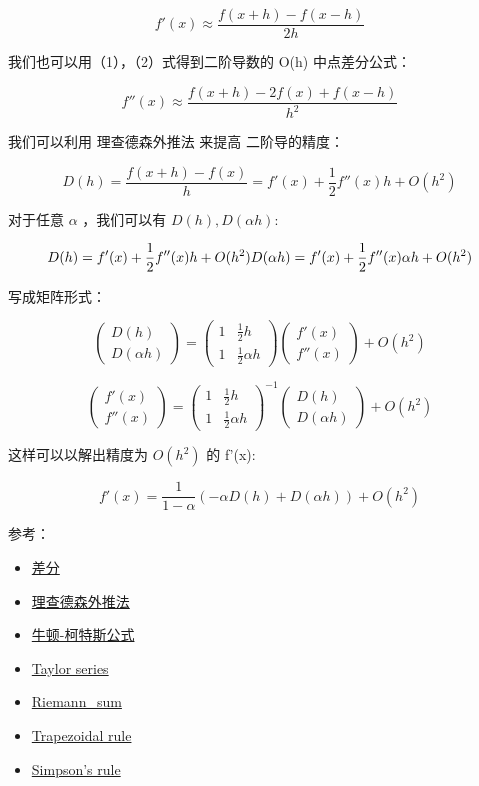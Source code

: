 \documentclass[
]{book}
\providecommand{\tightlist}{%
  \setlength{\itemsep}{0pt}\setlength{\parskip}{0pt}}
\begin{document}
\[
f'(x)  \approx \frac{f(x+h) - f(x-h)}{2h}
\]

我们也可以用（1），（2）式得到二阶导数的 O(h) 中点差分公式：

\[
f''(x) \approx \frac{f(x+h) - 2f(x) +  f(x-h)}{h^2}
\]

我们可以利用 理查德森外推法 来提高 二阶导的精度：

\[
D(h) = \frac{f(x+h) - f(x)}{h} = f'(x) + \frac{1}{2} f''(x) h + O(h^2)
\]

对于任意 \(\alpha\) ，我们可以有 \(D(h), D(\alpha h)\):

\[
D(h) = f'(x) + \frac{1}{2} f''(x) h + O(h^2) \\
D(\alpha h) = f'(x) + \frac{1}{2} f''(x) \alpha h + O(h^2) \\
\]

写成矩阵形式：

\[
 \begin{pmatrix} D(h) \\ D(\alpha h) \end{pmatrix}   = \begin{pmatrix} 1 & \frac{1}{2}h  \\ 1 & \frac{1}{2}\alpha h  \end{pmatrix}\begin{pmatrix} f'(x) \\ f''(x) \end{pmatrix}   + O(h^2)
\]

\[
\begin{pmatrix} f'(x) \\ f''(x) \end{pmatrix} = \begin{pmatrix} 1 & \frac{1}{2}h  \\ 1 & \frac{1}{2}\alpha h   \end{pmatrix}^{-1}  \begin{pmatrix} D(h) \\ D(\alpha h) \end{pmatrix}  + O(h^2)
\]

这样可以以解出精度为 \(O(h^2)\) 的 f'(x):

\[
f'(x) = \frac{1}{1- \alpha}(-\alpha D(h) + D(\alpha h)) + O(h^2)
\]

参考：

\begin{itemize}
\tightlist
\item
  \href{https://zh.wikipedia.org/wiki/差分\#單位步長情況}{差分}
\item
  \href{https://zh.wikipedia.org/wiki/理查德森外推法}{理查德森外推法}
\item
  \href{https://zh.wikipedia.org/wiki/牛頓－寇次公式}{牛顿-柯特斯公式}
\item
  \href{https://en.wikipedia.org/wiki/Taylor_series}{Taylor series}
\item
  \href{https://en.wikipedia.org/wiki/Riemann_sum}{Riemann\_sum}
\item
  \href{https://en.wikipedia.org/wiki/Trapezoidal_rule}{Trapezoidal rule}
\item
  \href{https://en.wikipedia.org/wiki/Simpson\%27s_rule}{Simpson's rule}
\end{itemize}
\end{document}
